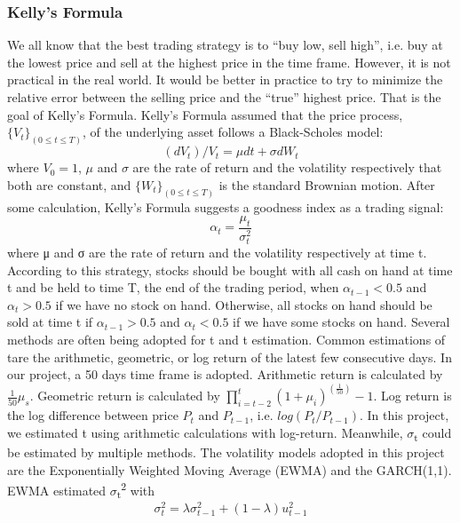\documentclass[11pt,a4paper]{article}
\begin{document}
    
    \subsubsection{Kelly's Formula}
    We all know that the best trading strategy is to ``buy low, sell high'', i.e. buy at the lowest price and sell at the highest price in the time frame. However, it is not practical in the real world. It would be better in practice to try to minimize the relative error between the selling price and the ``true'' highest price. That is the goal of Kelly's Formula.
    Kelly's Formula assumed that the price process, \(\{V_{t}\}_{(0\leq t\leq T)}\), of the underlying asset follows a Black-Scholes model: 
    \begin{equation}
    (dV_{t})/V_{t} = \mu dt + \sigma dW_{t}
    \end{equation}
    where \(V_{0} = 1\), \(\mu\) and \(\sigma\) are the rate of return and the volatility respectively that both are constant, and \(\{W_{t}\}_{(0\leq t \leq T)}\) is the standard Brownian motion.
    After some calculation, Kelly’s Formula suggests a goodness index as a trading signal:
    \begin{equation}
    \alpha_{t} = \frac{\mu_{t}}{\sigma_{t}^{2}}
    \end{equation}
    where μ and σ are the rate of return and the volatility respectively at time t.
    According to this strategy, stocks should be bought with all cash on hand at time t and be held to time T, the end of the trading period, when \(\alpha_{t-1}<0.5\) and \(\alpha_{t}>0.5\) if we have no stock on hand.
    Otherwise, all stocks on hand should be sold at time t if \(\alpha_{t-1}>0.5\) and \(\alpha_{t}<0.5\) if we have some stocks on hand.
    Several methods are often being adopted for t and t estimation. 
    Common estimations of tare the arithmetic, geometric, or log return of the latest few consecutive days. In our project, a 50 days time frame is adopted. Arithmetic return is calculated by \(\frac{1}{50}\mu_{s}\). Geometric return is calculated by \(\prod_{i=t-2}^{t}(1+\mu_{i})^{(\frac{1}{50})}-1\).
    Log return is the log difference between price \(P_t\) and \(P_{t-1}\), i.e. \(log(P_t/P_{t-1})\). In this project, we estimated t using arithmetic calculations with log-return.
    Meanwhile, \(\sigma\)\textsubscript{t} could be estimated by multiple methods. The volatility models adopted in this project are the Exponentially Weighted Moving Average (EWMA) and the GARCH(1,1). EWMA estimated \(\sigma\)\textsubscript{t}\textsuperscript{2} with    
    \begin{equation}
    \sigma_{t}^{2} = \lambda \sigma_{t-1}^{2}+(1-\lambda)u_{t-1}^{2}
    \end{equation}
\end{document}

